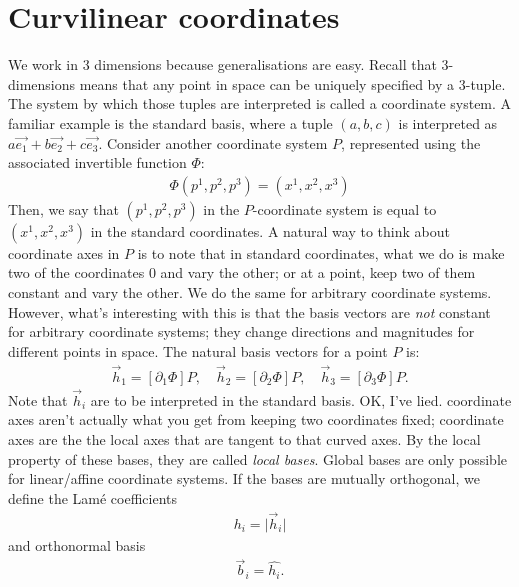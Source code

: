 \documentclass{article}
\theoremstyle{definition}
\begin{document}
\section{Curvilinear coordinates}
We work in 3 dimensions because generalisations are easy. Recall that 3-dimensions means that any point in space can be uniquely specified by a 3-tuple. The system by which those tuples are interpreted is called a coordinate system. A familiar example is the standard basis, where a tuple $(a,b,c)$ is interpreted as $a\vec{e_1}+b\vec{e_2}+c\vec{e_3}$. Consider another coordinate system $P$, represented using the associated invertible function $\Phi$:
\begin{align*}
	\Phi(p^1,p^2,p^3)=(x^1,x^2,x^3)
\end{align*}
Then, we say that $(p^1,p^2,p^3)$ in the $P$-coordinate system is equal to $(x^1,x^2,x^3)$ in the standard coordinates.
A natural way to think about coordinate axes in $P$ is to note that in standard coordinates, what we do is make two of the coordinates 0 and vary the other; or at a point, keep two of them constant and vary the other. We do the same for arbitrary coordinate systems. However, what's interesting with this is that the basis vectors are \emph{not} constant for arbitrary coordinate systems; they change directions and magnitudes for different points in space. The natural basis vectors for a point $P$ is:
\begin{align*}
	\vec h_1=[\partial_1\Phi]P,\quad\vec h_2=[\partial_2\Phi]P,\quad\vec h_3=[\partial_3\Phi]P.
\end{align*}
Note that $\vec h_i$ are to be interpreted in the standard basis.
OK, I've lied. coordinate axes aren't actually what you get from keeping two coordinates fixed; coordinate axes are the the local axes that are tangent to that curved axes.
By the local property of these bases, they are called \emph{local bases}. Global bases are only possible for linear/affine coordinate systems. If the bases are mutually orthogonal, we define the Lamé coefficients
\begin{align*}
	h_i=\lvert\vec h_i\rvert
\end{align*}
and orthonormal basis
\begin{align*}
	\vec b_i=\hat{h_i}.
\end{align*}
\end{document}
